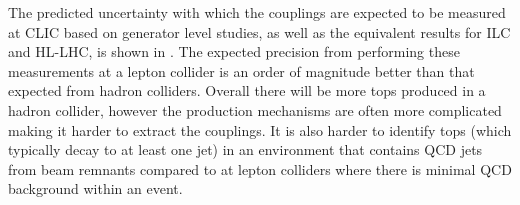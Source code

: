 The predicted uncertainty with which the couplings are expected to be measured at \ac{CLIC} based on generator level studies, as well as the equivalent results for \ac{ILC} and \ac{HL-LHC}, is shown in . The expected precision from performing these measurements at a lepton collider is an order of magnitude better than that expected from hadron colliders. Overall there will be more tops produced in a hadron collider, however the production mechanisms are often more complicated making it harder to extract the couplings. It is also harder to identify tops (which typically decay to at least one jet) in an environment that contains \ac{QCD} jets from beam remnants compared to at lepton colliders where there is minimal \ac{QCD} background within an event.
